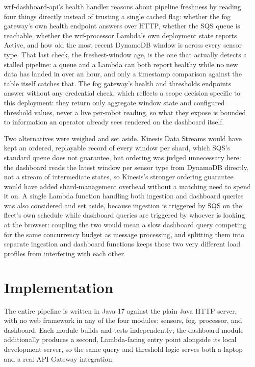 \documentclass[conference]{IEEEtran}
\begin{document}
wrf-dashboard-api's health handler reasons about pipeline freshness by reading four things directly instead of trusting a single cached flag: whether the fog gateway's own health endpoint answers over HTTP, whether the SQS queue is reachable, whether the wrf-processor Lambda's own deployment state reports Active, and how old the most recent DynamoDB window is across every sensor type. That last check, the freshest-window age, is the one that actually detects a stalled pipeline: a queue and a Lambda can both report healthy while no new data has landed in over an hour, and only a timestamp comparison against the table itself catches that. The fog gateway's health and thresholds endpoints answer without any credential check, which reflects a scope decision specific to this deployment: they return only aggregate window state and configured threshold values, never a live per-robot reading, so what they expose is bounded to information an operator already sees rendered on the dashboard itself.

Two alternatives were weighed and set aside. Kinesis Data Streams would have kept an ordered, replayable record of every window per shard, which SQS's standard queue does not guarantee, but ordering was judged unnecessary here: the dashboard reads the latest window per sensor type from DynamoDB directly, not a stream of intermediate states, so Kinesis's stronger ordering guarantee would have added shard-management overhead without a matching need to spend it on. A single Lambda function handling both ingestion and dashboard queries was also considered and set aside, because ingestion is triggered by SQS on the fleet's own schedule while dashboard queries are triggered by whoever is looking at the browser: coupling the two would mean a slow dashboard query competing for the same concurrency budget as message processing, and splitting them into separate ingestion and dashboard functions keeps those two very different load profiles from interfering with each other.

\section{Implementation}

The entire pipeline is written in Java 17 against the plain Java HTTP server, with no web framework in any of the four modules: sensors, fog, processor, and dashboard. Each module builds and tests independently; the dashboard module additionally produces a second, Lambda-facing entry point alongside its local development server, so the same query and threshold logic serves both a laptop and a real API Gateway integration.
\end{document}
